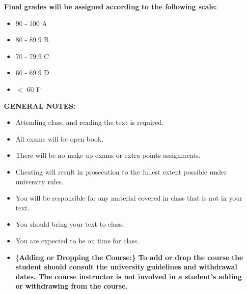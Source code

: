 \documentclass[11pt]{article}
\begin{document}
\begin{center}
\textbf{Final grades will be assigned according to the following scale:}
\end{center}

\begin{itemize}
\item 90 - 100 A
\item 80 - 89.9 B
\item 70 - 79.9 C
\item 60 - 69.9 D
\item $<$ 60 F
\end{itemize}

\begin{center}
\textbf{GENERAL NOTES:}
\end{center}

\begin{itemize}
\item Attending class, and reading the text is required.
\item All exams will be open book.
\item There will be no make up exams or extra points assignments.
\item Cheating will result in prosecution to the fullest extent possible under university rules.
\item You will be responsible for any material covered in class that is not in your text.
\item You should bring your text to class.
\item You are expected to be on time for class.
\item \{\bf Adding or Dropping the Course:\}  To add or drop the course the student should consult the university guidelines and withdrawal dates.  The course instructor is not involved in a student's adding or withdrawing from the course.
\end{itemize}
\end{document}
